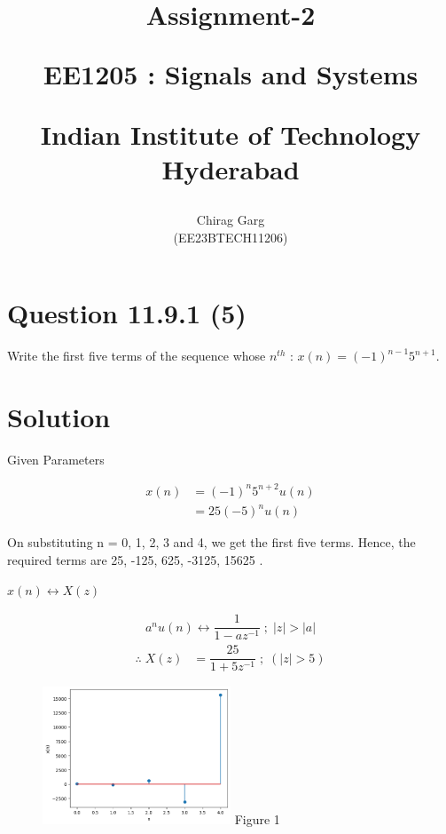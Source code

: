 \documentclass[journal,12pt,twocolumn]{IEEEtran}
\theoremstyle{remark}
\begin{document}

\vspace{3cm}

\title{
Assignment-2

\large{EE1205 : Signals and Systems}

Indian Institute of Technology Hyderabad
}
\author{Chirag Garg

(EE23BTECH11206)
}	
\maketitle
\newpage
\bigskip



\section{Question 11.9.1 (5)}
\vspace{0.5cm}
\begin{flushleft}
 Write the first five terms of the sequence whose $n^{th}$  : $x(n) = (-1)^{n-1}5^{n+1}$.
\end{flushleft} 


\vspace{0.8cm}


\section{Solution} 



\begin{table}[htbp]
\centering
\resizebox{\columnwidth}{!}{
}
\caption{ Given Parameters}

\end{table}

\begin{align}
	     x(n) &= (-1)^{n}5^{n+2}u(n) \\
	     &=25(-5)^{n}u(n)
 \end{align}
 
On substituting n = 0, 1, 2, 3 and 4, we get the first five terms.
Hence, the required terms are 25, -125, 625, -3125, 15625 .\\

\begin{center}
 $x(n) \longleftrightarrow X(z)$
\end{center}
 \begin{align}
a^{n}u(n)  \longleftrightarrow  \dfrac{1}{1 - az^{-1}} \; ; \; |z| > |a| 
 \end{align}
  \begin{align}
\therefore \; X(z) &= \dfrac{25}{1 + 5z^{-1}} \; ; \;( |z| > 5 )
 \end{align}


\begin{figure}
  \centering
  \includegraphics[width=0.5\textwidth]{figures/grasi2.png} 
 Figure 1
\end{figure}
\end{document}
